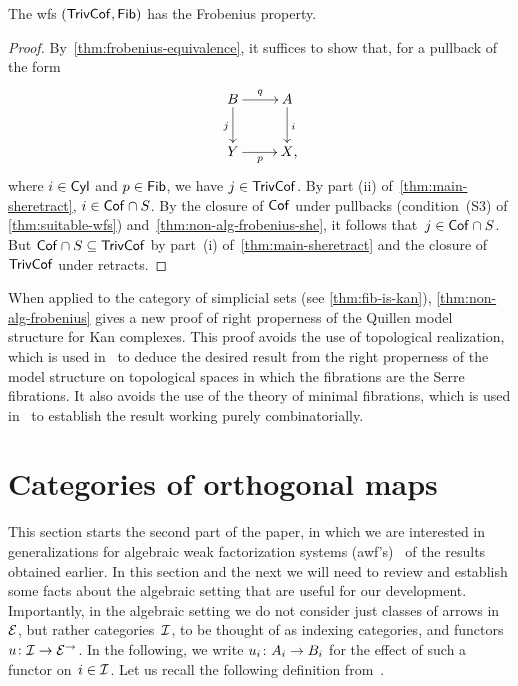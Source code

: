 \documentclass[reqno,10pt,a4paper,oneside,draft]{amsart}
\begin{document}
{{\begin{theorem} \label{thm:non-alg-frobenius}
The wfs $(\TrivCof, \Fib)$ has the Frobenius property.
\end{theorem}

\begin{proof}
By~\cref{thm:frobenius-equivalence}, it suffices to show that, for a pullback of the form
\begin{equation*}
\begin{gathered}
\xymatrix{
 B \ar[d]_j \ar[r]^q & A \ar[d]^i \\
Y \ar[r]_p & X \rlap{,}}
\end{gathered}
\end{equation*}
where $i \in \Cyl$ and $p \in \Fib$, we have $j \in \TrivCof$.
By part (ii) of~\cref{thm:main-sheretract}, $i \in \Cof \cap S$.
By the closure of $\Cof$ under pullbacks (condition~(S3) of \cref{thm:suitable-wfs}) and~\cref{thm:non-alg-frobenius-she}, it follows that~$j \in \Cof \cap S$.
But $\Cof \cap S \subseteq \TrivCof$ by part~(i) of~\cref{thm:main-sheretract} and the closure of $\TrivCof$ under retracts.
\end{proof}

\begin{example}
When applied to the category of simplicial sets (see \cref{thm:fib-is-kan}), \cref{thm:non-alg-frobenius} gives a new proof of right properness of the Quillen model structure for Kan complexes.
This proof avoids the use of topological realization, which is used in~\cite[Theorem~13.1.13]{hirschhorn-model-localizations} to deduce the desired result from the right properness of the model structure on topological spaces in which the fibrations are the Serre fibrations.
It also avoids the use of the theory of minimal fibrations, which is used in~\cite[Theorem~1.7.1]{joyal-tierney-notes} to establish the result working purely combinatorially.
\end{example}

\section{Categories of orthogonal maps}
\label{sec:ortf}

This section starts the second part of the paper, in which we are interested in generalizations for algebraic weak factorization systems (awf's)~\cite{garner:small-object-argument,grandis-tholen-nwfs} of the results obtained earlier.
In this section and the next we will need to review and establish some facts about the algebraic setting that are useful for our development.
Importantly, in the algebraic setting we do not consider just classes of arrows in $\catE$, but rather categories~$\cal{I}$, to be thought of as indexing categories, and functors~$u \co \cal{I} \to \catE^\to$.
In the following, we write $u_i \co A_i \to B_i$ for the effect of such a functor on~$i \in \cal{I}$.
Let us recall the following definition from~\cite{garner:small-object-argument}.

}}
\end{document}
